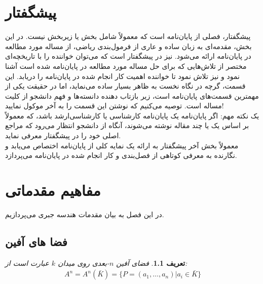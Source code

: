 \documentclass[12pt]{report}
\newtheorem{defn}[thm]{تعریف}
\begin{document}
	
	
	
	\chapter*{پیشگفتار }
	
	پیشگفتار، فصلی از پایان‌نامه است که معمولاً شامل بخش یا زیربخش نیست. در این بخش، مقدمه‌ای به زبان ساده و عاری از فرمول‌بندی ریاضی، از مساله مورد مطالعه در پایان‌نامه ارائه می‌شود. نیز در پیشگفتار است که می‌توان خواننده را با تاریخچه‌ای مختصر از تلاش‌هایی که برای حل مساله مورد مطالعه در پایان‌نامه شده است آشنا نمود و نیز تلاش نمود تا خواننده اهمیت کار انجام شده در پایان‌نامه را دریابد. این قسمت، گرچه در نگاه نخست به ظاهر بسیار ساده می‌نماید، اما در حقیقت یکی از  مهمترین قسمت‌های پایان‌نامه است، زیر بازتاب دهنده دانسته‌ها و فهم دانشجو از کلیت مساله است. توصیه می‌کنیم که نوشتن این قسمت را به آخر موکول نمایید!
	\\
	یک نکته مهم: اگر پایان‌نامه یک پایان‌نامه کارشناسی یا کارشناسی‌ارشد باشد، که معمولاً بر اساس یک یا چند مقاله نوشته می‌شوند، آنگاه از دانشجو انتظار می‌رود که مراجع اصلی خود را در پیشگفتار معرفی نماید.
	\\
	معمولاً بخش آخر پیشگفتار به ارائه یک نمایه کلی از پایان‌نامه اختصاص می‌یابد و نگارنده به معرفی کوتاهی از فصل‌بندی و کار انجام شده در پایان‌نامه می‌پردازد.
	
	\tableofcontents
	
	\chapter{مفاهیم مقدماتی}
	
	\pagestyle{plain}
	\setcounter{page}{1}
	
	در این فصل به بیان مقدمات هندسه جبری می‌پردازیم.
	\section{فضا های آفین}
	\begin{defn}
		فضای آفین $n$-بعدی روی میدان $k$ عبارت است از: 
		\begin{equation*}
			\begin{aligned}
				A^n= A^n(\bar{K}) = \{P=(a_1,\dots, a_n)| a_i \in \bar{K}\}
			\end{aligned}
		\end{equation*}
	\end{defn}
	
\end{document}
